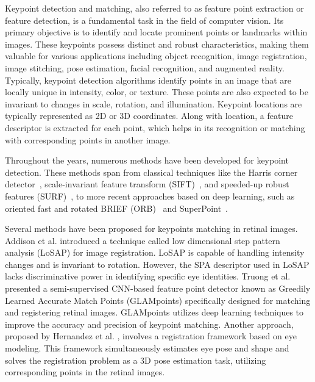 \documentclass[10pt,twocolumn,letterpaper]{article}
\begin{document}
Keypoint detection and matching, also referred to as feature point extraction or feature detection, is a fundamental task in the field of computer vision. Its primary objective is to identify and locate prominent points or landmarks within images. These keypoints possess distinct and robust characteristics, making them valuable for various applications including object recognition, image registration, image stitching, pose estimation, facial recognition, and augmented reality. Typically, keypoint detection algorithms identify points in an image that are locally unique in intensity, color, or texture. These points are also expected to be invariant to changes in scale, rotation, and illumination. Keypoint locations are typically represented as 2D or 3D coordinates. Along with location, a feature descriptor is extracted for each point, which helps in its recognition or matching with corresponding points in another image. 

Throughout the years, numerous methods have been developed for keypoint detection. These methods span from classical techniques like the Harris corner detector~\cite{ryu2011formula}, scale-invariant feature transform (SIFT)~\cite{lowe2004distinctive}, and speeded-up robust features (SURF)~\cite{bay2006surf}, to more recent approaches based on deep learning, such as oriented fast and rotated BRIEF (ORB)~\cite{rublee2011orb} and SuperPoint~\cite{detone2018superpoint}.

Several methods have been proposed for keypoints matching in retinal images. Addison et al. \cite{addison2015low} introduced a technique called low dimensional step pattern analysis (LoSAP) for image registration. LoSAP is capable of handling intensity changes and is invariant to rotation. However, the SPA descriptor used in LoSAP lacks discriminative power in identifying specific eye identities. Truong et al. \cite{truong2019glampoints} presented a semi-supervised CNN-based feature point detector known as Greedily Learned Accurate Match Points (GLAMpoints) specifically designed for matching and registering retinal images. GLAMpoints utilizes deep learning techniques to improve the accuracy and precision of keypoint matching. Another approach, proposed by Hernandez et al. \cite{hernandez2020rempe}, involves a registration framework based on eye modeling. This framework simultaneously estimates eye pose and shape and solves the registration problem as a 3D pose estimation task, utilizing corresponding points in the retinal images.
\end{document}
